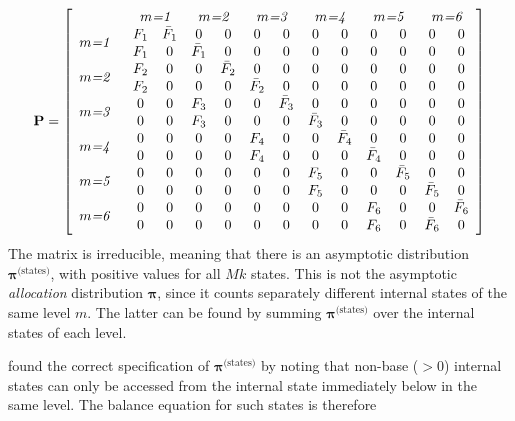 \begin{equation}\label{eq:kPmat}
\mathbf{P}=\left[\begin{array}{p{1cm}cccccccccccc}
& \multicolumn{2}{c}{\emph{$m$=1}} & \multicolumn{2}{c}{\emph{$m$=2}}& \multicolumn{2}{c}{\emph{$m$=3}}& \multicolumn{2}{c}{\emph{$m$=4}}& \multicolumn{2}{c}{\emph{$m$=5}}& \multicolumn{2}{c}{\emph{$m$=6}} \\
  \multirow{2}{*}{\emph{$m$=1}} &  F_1 &\bar{F}_1 &0 &0 &0 &0 &0 &0 &0 &0 &0 & 0\\
   &  F_1 &0         &\bar{F}_1 &0 &0 &0 &0 &0 &0 &0 &0& 0\\
  \multirow{2}{*}{\emph{$m$=2}} &  F_2 &0 &0 &\bar{F}_2 &0 &0 &0 &0 &0 &0 &0& 0\\
 &   F_2 &0 &0 &0 &\bar{F}_2  &0 &0 &0 &0 &0 &0& 0\\
  \multirow{2}{*}{\emph{$m$=3}} &  0    &0 &F_3 &0 &0   &\bar{F}_3 &0 &0 &0 &0 &0& 0\\
  &  0    &0 &F_3 &0 &0   &0 &\bar{F}_3 &0 &0 &0 &0& 0\\
  \multirow{2}{*}{\emph{$m$=4}} &  0    &0 &0   &0 &F_4 &0 & 0&\bar{F}_4 &0 &0 &0 &0\\
  &  0    &0 &0   &0 &F_4 &0 &0      & 0   &\bar{F}_4 &0 &0 &0\\
  \multirow{2}{*}{\emph{$m$=5}} &  0    &0 &0   &0 &0   &0 &F_5    & 0   &0 &\bar{F}_5 &0 &0\\
  &  0    &0 &0   &0 &0   &0 &F_5    & 0   &0 &0 &\bar{F}_5 &0\\
 \multirow{2}{*}{\emph{$m$=6}} &   0    &0 &0   &0 &0   &0 &0         &0 &F_6 &0 & 0&\bar{F}_6\\
  &  0    &0 &0   &0 &0   &0 &0         &0 &F_6 & 0 &\bar{F}_6 & 0\\
\end{array}\right]
\end{equation}
The matrix is irreducible, meaning that there is an asymptotic distribution $\boldsymbol{\pi}^{\textrm{(states)}}$, with positive values for all $Mk$ states. This is not the asymptotic \emph{allocation} distribution $\boldsymbol{\pi}$, since it counts separately different internal states of the same level $m$. The latter can be found by summing $\boldsymbol{\pi}^{\textrm{(states)}}$ over the internal states of each level.

\cite{Gezm:Geom:1996} found the correct specification of $\boldsymbol{\pi}^{\textrm{(states)}}$ by noting that non-base ($>0$) internal states can only be accessed from the internal state immediately below in the same level. The balance equation for such states is therefore

